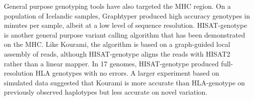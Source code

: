 General purpose genotyping tools have also targeted the MHC region.
On a population of Icelandic samples, Graphtyper \cite{eggertsson2017graphtyper} produced high accuracy genotypes in minutes per sample, albeit at a low level of sequence resolution.
HISAT-genotype \cite{Kim_2019} is another general purpose variant calling algorithm that has been demonstrated on the MHC.
Like Kourami, the algorithm is based on a graph-guided local assembly of reads, although HISAT-genotype aligns the reads with HISAT2 rather than a linear mapper.
In 17 genomes, HISAT-genotype produced full-resolution HLA genotypes with no errors.
A larger experiment based on simulated data suggested that Kourami is more accurate than HLA-genotype on previously observed haplotypes but less accurate on novel variation.





